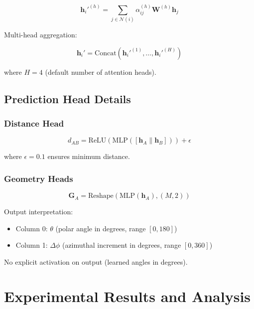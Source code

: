 \documentclass[11pt,a4paper]{article}
\begin{document}
\begin{equation}
\mathbf{h}_i'^{(h)} = \sum_{j \in \mathcal{N}(i)} \alpha_{ij}^{(h)} \mathbf{W}^{(h)} \mathbf{h}_j
\end{equation}

Multi-head aggregation:

\begin{equation}
\mathbf{h}_i' = \text{Concat}(\mathbf{h}_i'^{(1)}, \ldots, \mathbf{h}_i'^{(H)})
\end{equation}

where $H = 4$ (default number of attention heads).

\subsection{Prediction Head Details}

\subsubsection{Distance Head}

\begin{equation}
d_{AB} = \text{ReLU}(\text{MLP}([\mathbf{h}_A \| \mathbf{h}_B])) + \epsilon
\end{equation}

where $\epsilon = 0.1$ ensures minimum distance.

\subsubsection{Geometry Heads}

\begin{equation}
\mathbf{G}_A = \text{Reshape}(\text{MLP}(\mathbf{h}_A), (M, 2))
\end{equation}

Output interpretation:
\begin{itemize}
    \item Column 0: $\theta$ (polar angle in degrees, range $[0, 180]$)
    \item Column 1: $\Delta\phi$ (azimuthal increment in degrees, range $[0, 360]$)
\end{itemize}

No explicit activation on output (learned angles in degrees).

\clearpage

\section{Experimental Results and Analysis}
\end{document}
